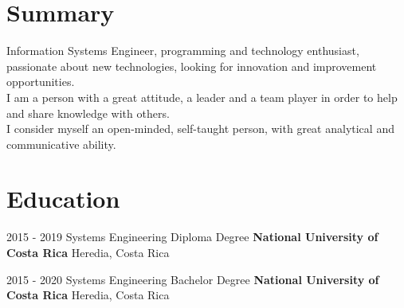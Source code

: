 \documentclass[letterpaper]{twentysecondcv} %
\begin{document}
\makeprofile %
\section{Summary}
\small{Information Systems Engineer, programming and technology enthusiast, passionate about new technologies, looking for innovation and improvement opportunities. \\
I am a person with a great attitude, a leader and a team player in order to help and share knowledge with others. \\
I consider myself an open-minded, self-taught person, with great analytical and communicative ability.}\\

\section{Education}

\begin{twenty}
	\twentyitem
    	{2015 - 2019}
        {Systems Engineering Diploma Degree}
        {{\textbf{National University of Costa Rica}}}
        {Heredia, Costa Rica}
      
	\twentyitem
    	{2015 - 2020}
        {Systems Engineering Bachelor Degree}
        {{\textbf{National University of Costa Rica}}}
        {Heredia, Costa Rica}
        

\end{twenty}
\end{document}
